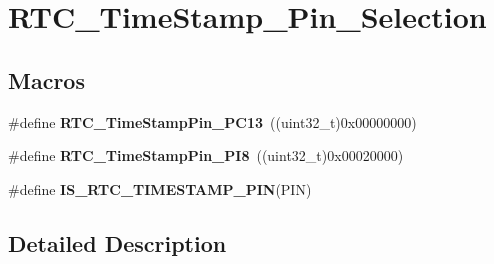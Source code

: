 \hypertarget{group___r_t_c___time_stamp___pin___selection}{\section{R\-T\-C\-\_\-\-Time\-Stamp\-\_\-\-Pin\-\_\-\-Selection}
\label{group___r_t_c___time_stamp___pin___selection}
}
\subsection*{Macros}
\begin{DoxyCompactItemize}
\item 
\hypertarget{group___r_t_c___time_stamp___pin___selection_gac71b083719de65957ef1577e047bdc74}{\#define {\bfseries R\-T\-C\-\_\-\-Time\-Stamp\-Pin\-\_\-\-P\-C13}~((uint32\-\_\-t)0x00000000)}\label{group___r_t_c___time_stamp___pin___selection_gac71b083719de65957ef1577e047bdc74}

\item 
\hypertarget{group___r_t_c___time_stamp___pin___selection_ga82b60e881b00b0106a2e75df19760ad0}{\#define {\bfseries R\-T\-C\-\_\-\-Time\-Stamp\-Pin\-\_\-\-P\-I8}~((uint32\-\_\-t)0x00020000)}\label{group___r_t_c___time_stamp___pin___selection_ga82b60e881b00b0106a2e75df19760ad0}

\item 
\#define {\bfseries I\-S\-\_\-\-R\-T\-C\-\_\-\-T\-I\-M\-E\-S\-T\-A\-M\-P\-\_\-\-P\-I\-N}(P\-I\-N)
\end{DoxyCompactItemize}


\subsection{Detailed Description}


